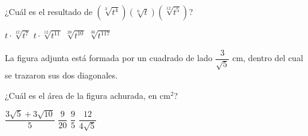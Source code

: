 \documentclass[revolver]{srs}
\begin{document}
\begin{preguntas}[after-item-skip=2cm]

\pregunta ¿Cuál es el resultado de $\left(\sqrt[3]{t^4}\right)\left(\sqrt[6]{t}\right)\left(\sqrt[12]{t^5}\right)$?
\begin{vertical}
\alternativa $t \cdot \sqrt[12]{t^7}$
\alternativa $t \cdot \sqrt[12]{t^{11}}$
\alternativa $\sqrt[20]{t^{10}}$
\alternativa $\sqrt[30]{t^{117}}$
\end{vertical}

\pregunta La figura adjunta está formada por un cuadrado de lado $\dfrac{3}{\sqrt{5}}$ cm, dentro del cual se trazaron sus dos diagonales.
\begin{centrado}
\end{centrado}
¿Cuál es el área de la figura achurada, en cm$^2$?
\begin{vertical}
\alternativa $\dfrac{3\sqrt{5}+3\sqrt{10}}{5}$
\alternativa $\dfrac{9}{20}$
\alternativa $\dfrac{9}{5}$
\alternativa $\dfrac{12}{4\sqrt{5}}$
\end{vertical}

\end{preguntas}
\end{document}
